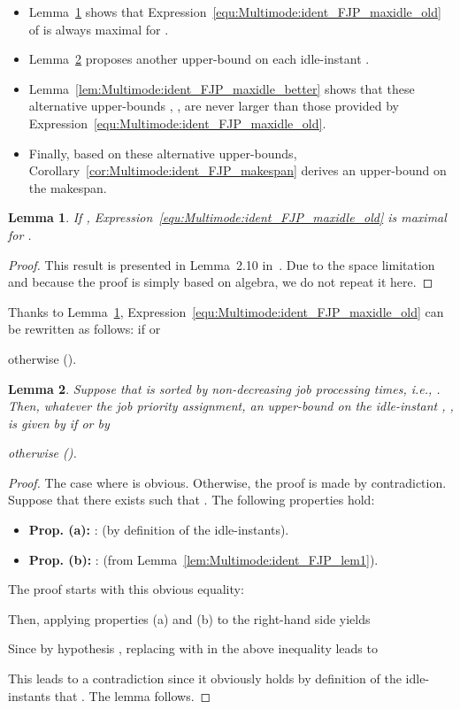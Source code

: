 \documentclass{article}
\newtheorem{validity test}{Validity Test}
\newtheorem{Lemma}{Lemma}
\newtheorem{proof}{Proof}
\begin{document}
\begin{itemize}
\renewcommand{\labelitemi}{}
\item Lemma~\ref{lem:Multimode:ident_FJP_maxidle_old_max} shows that Expression~\ref{equ:Multimode:ident_FJP_maxidle_old} of  is always maximal for .
\item Lemma~\ref{lem:Multimode:ident_FJP_maxidle} proposes another upper-bound  on each idle-instant .
\item Lemma~\ref{lem:Multimode:ident_FJP_maxidle_better} shows that these alternative upper-bounds , , are never larger than those provided by Expression~\ref{equ:Multimode:ident_FJP_maxidle_old}. 
\item Finally, based on these alternative upper-bounds, Corollary~\ref{cor:Multimode:ident_FJP_makespan} derives an upper-bound on the makespan. 
\end{itemize}

\begin{Lemma}
\label{lem:Multimode:ident_FJP_maxidle_old_max}
If , Expression~\ref{equ:Multimode:ident_FJP_maxidle_old} is maximal for .
\end{Lemma} 
\begin{proof}
This result is presented in Lemma~2.10 in~\cite{Nelis:10}. Due to the space limitation and because the proof is simply based on algebra, we do not repeat it here.
\end{proof}

Thanks to Lemma~\ref{lem:Multimode:ident_FJP_maxidle_old_max}, Expression~\ref{equ:Multimode:ident_FJP_maxidle_old} can be rewritten as follows:  if  or 

otherwise (). 

\begin{Lemma}
\label{lem:Multimode:ident_FJP_maxidle}
Suppose that  is sorted by non-decreasing job processing times, i.e., . Then, whatever the job priority assignment, an upper-bound  on the idle-instant , , is given by  if  or by

otherwise ().
\end{Lemma} 
\begin{proof}
The case where  is obvious. Otherwise, the proof is made by contradiction. Suppose that there exists  such that . The following properties hold:
\begin{itemize}
\item \textbf{Prop. (a):} :  (by definition of the idle-instants).
\item \textbf{Prop. (b):} :  (from Lemma~\ref{lem:Multimode:ident_FJP_lem1}).
\end{itemize}
\noindent The proof starts with this obvious equality:

\noindent Then, applying properties (a) and (b) to the right-hand side yields

Since by hypothesis , replacing  with  in the above inequality leads to

\noindent This leads to a contradiction since it obviously holds by definition of the idle-instants that . The lemma follows.
\end{proof}
\end{document}
